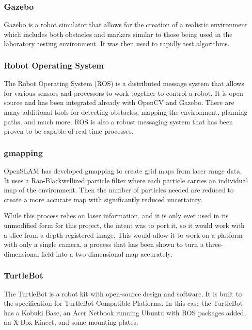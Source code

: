 \documentclass{article}[12]
\begin{document}
		\subsubsection{Gazebo}
		
		Gazebo is a robot simulator that allows for the creation of a realistic environment which includes both obstacles and markers similar to those being used in the laboratory testing environment. It was then used to rapidly test algorithms.
		
		\subsubsection{Robot Operating System}
		
		The Robot Operating System (ROS) is a distributed message system that allows for various sensors and processors to work together to control a robot. It is open source and has been integrated already with OpenCV and Gazebo. There are many additional tools for detecting obstacles, mapping the environment, planning paths, and much more. ROS is also a robust messaging system that has been proven to be capable of real-time processes.
		
		\subsubsection{gmapping}
		
		OpenSLAM has developed gmapping to create grid maps from laser range data. It uses a Rao-Blackwellized particle filter where each particle carries an individual map of the environment. Then the number of particles needed are reduced to create a more accurate map with significantly reduced uncertainty.\cite{grisetti_stachniss_burgard}
		
		While this process relies on laser information, and it is only ever used in its unmodified form for this project, the intent was to port it, so it would work with a slice from a depth registered image. This would allow it to work on a platform with only a single camera, a process that has been shown to turn a three-dimensional field into a two-dimensional map accurately.\cite{2018nanomap}
		
		
		\subsubsection{TurtleBot}
		
		The TurtleBot is a robot kit with open-source design and software. It is built to the specification for TurtleBot Compatible Platforms\cite{wise_foote_2011}. In this case the TurtleBot has a Kobuki Base, an Acer Netbook running Ubuntu with ROS packages added, an X-Box Kinect, and some mounting plates. 
		
\end{document}
